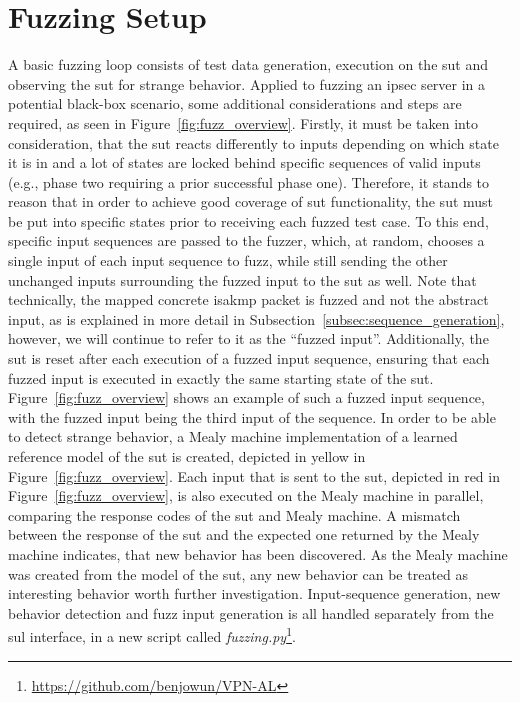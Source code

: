 \section{Fuzzing Setup} \label{sec:fuzz_intro}
A basic fuzzing loop consists of test data generation, execution on the \ac{sut} and observing the \ac{sut} for strange behavior. Applied to fuzzing an \ac{ipsec} server in a potential black-box scenario, some additional considerations and steps are required, as seen in Figure~\ref{fig:fuzz_overview}. Firstly, it must be taken into consideration, that the \ac{sut} reacts differently to inputs depending on which state it is in and a lot of states are locked behind specific sequences of valid inputs (e.g., phase two requiring a prior successful phase one). Therefore, it stands to reason that in order to achieve good coverage of \ac{sut} functionality, the \ac{sut} must be put into specific states prior to receiving each fuzzed test case. To this end, specific input sequences are passed to the fuzzer, which, at random, chooses a single input of each input sequence to fuzz, while still sending the other unchanged inputs surrounding the fuzzed input to the \ac{sut} as well.
Note that technically, the mapped concrete \ac{isakmp} packet is fuzzed and not the abstract input, as is explained in more detail in Subsection~\ref{subsec:sequence_generation}, however, we will continue to refer to it as the ``fuzzed input''.
Additionally, the \ac{sut} is reset after each execution of a fuzzed input sequence, ensuring that each fuzzed input is executed in exactly the same starting state of the \ac{sut}. Figure~\ref{fig:fuzz_overview} shows an example of such a fuzzed input sequence, with the fuzzed input being the third input of the sequence. In order to be able to detect strange behavior, a Mealy machine implementation of a learned reference model of the \ac{sut} is created, depicted in yellow in Figure~\ref{fig:fuzz_overview}. Each input that is sent to the \ac{sut}, depicted in red in Figure~\ref{fig:fuzz_overview}, is also executed on the Mealy machine in parallel, comparing the response codes of the \ac{sut} and Mealy machine. A mismatch between the response of the \ac{sut} and the expected one returned by the Mealy machine indicates, that new behavior has been discovered. As the Mealy machine was created from the model of the \ac{sut}, any new behavior can be treated as interesting behavior worth further investigation. Input-sequence generation, new behavior detection and fuzz input generation is all handled separately from the \ac{sul} interface, in a new script called \emph{fuzzing.py}\footnote{\url{https://github.com/benjowun/VPN-AL}}.

